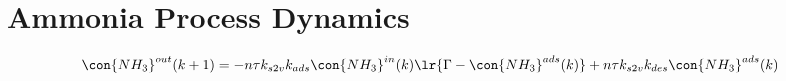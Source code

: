 \section{Ammonia Process Dynamics}

\begin{align}
    \con{NH_3}^{out}(k+1) &= -n\tau k_{s2v} k_{ads} \con{NH_3}^{in}(k) \lr{\Gamma - \con{NH_3}^{ads}(k)} + n\tau k_{s2v} k_{des} \con{NH_3}^{ads}(k)
\end{align}
